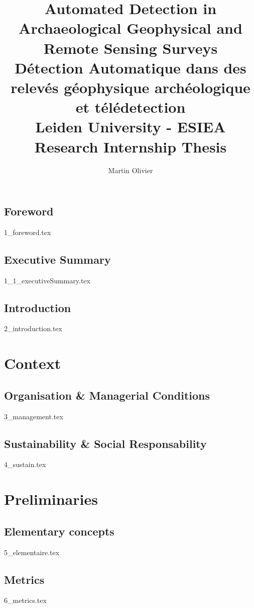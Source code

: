 \documentclass[a4paper, 12pt, titlepage, oneside]{report}
\author{Martin Olivier}
\title{Automated Detection in Archaeological Geophysical and Remote Sensing Surveys\\
	\large Détection Automatique dans des relevés géophysique archéologique et télédetection \\
\textbf{Leiden University - ESIEA}\\
	\lineskip
	\large Research Internship Thesis
}
\begin{document}
\maketitle

\tableofcontents
\newpage

\listoffigures
\newpage

\listoftables
\newpage

\chapter{Foreword}
{1_foreword.tex}
\newpage

\chapter{Executive Summary}
{1_1_executiveSummary.tex}
\newpage

\chapter{Introduction}
{2_introduction.tex}
\newpage

\part{Context}
\chapter{Organisation \& Managerial Conditions}
{3_management.tex}
\newpage

\chapter{Sustainability \& Social Responsability}
{4_sustain.tex}
\newpage

\part{Preliminaries}

\chapter{Elementary concepts}\label{elementaire}
{5_elementaire.tex}
\newpage

\chapter{Metrics}
{6_metrics.tex}
\newpage
\end{document}
